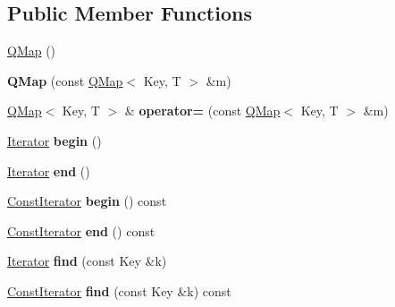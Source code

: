 \subsection*{Public Member Functions}
\begin{DoxyCompactItemize}
\item 
\mbox{\hyperlink{class_q_map_a72c9b87bd2e154fc1a0afc0bd6cc4223}{Q\+Map}} ()
\item 
\mbox{\label{class_q_map_a2cf7810ecb7acc088ca19c64e287432d}} 
{\bfseries Q\+Map} (const \mbox{\hyperlink{class_q_map}{Q\+Map}}$<$ Key, T $>$ \&m)
\item 
\mbox{\label{class_q_map_a2e06720686f4ade87f059e42cf568ab2}} 
\mbox{\hyperlink{class_q_map}{Q\+Map}}$<$ Key, T $>$ \& {\bfseries operator=} (const \mbox{\hyperlink{class_q_map}{Q\+Map}}$<$ Key, T $>$ \&m)
\item 
\mbox{\label{class_q_map_a639a776efedf32becf3bf97d0cc8bc6e}} 
\mbox{\hyperlink{class_q_map_aa920e1d34440b34269b350ab96bd73d0}{Iterator}} {\bfseries begin} ()
\item 
\mbox{\label{class_q_map_abd36bc62901297a50e7ef45e94bd719e}} 
\mbox{\hyperlink{class_q_map_aa920e1d34440b34269b350ab96bd73d0}{Iterator}} {\bfseries end} ()
\item 
\mbox{\label{class_q_map_af8c35ae4e0940f03a8e7f20bbfde385e}} 
\mbox{\hyperlink{class_q_map_const_iterator}{Const\+Iterator}} {\bfseries begin} () const
\item 
\mbox{\label{class_q_map_ac5f193a04c5d39cc4786e56bd7810e55}} 
\mbox{\hyperlink{class_q_map_const_iterator}{Const\+Iterator}} {\bfseries end} () const
\item 
\mbox{\label{class_q_map_a70dc38ad3663dbb8aacf657711a9acee}} 
\mbox{\hyperlink{class_q_map_aa920e1d34440b34269b350ab96bd73d0}{Iterator}} {\bfseries find} (const Key \&k)
\item 
\mbox{\label{class_q_map_a134b8d413869f229431d5854ed693649}} 
\mbox{\hyperlink{class_q_map_const_iterator}{Const\+Iterator}} {\bfseries find} (const Key \&k) const
\item 
\mbox{\label{class_q_map_acafebec45466a5329663be6129afcb00}} 

\end{DoxyCompactItemize}
